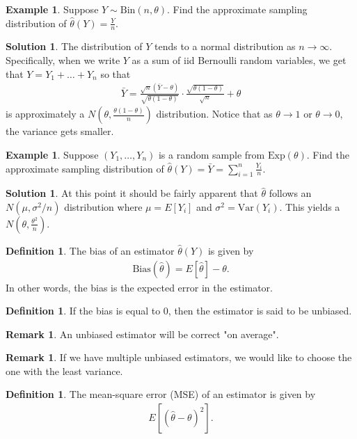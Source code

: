 \documentclass[11pt]{amsart}
\theoremstyle{definition}
\newtheorem{definition}[theorem]{Definition}
\newtheorem{remark}[theorem]{Remark}
\newtheorem{example}[theorem]{Example}
\newtheorem{solution}[theorem]{Solution}
\numberwithin{equation}{section}
\begin{document}
\begin{example}
    Suppose $Y\sim \mathrm{Bin}(n,\theta)$. Find the approximate sampling distribution of $\hat\theta(Y)=\frac{Y}{n}$.
\end{example}
\addtocounter{theorem}{-1}
\begin{solution}
    The distribution of $Y$ tends to a normal distribution as $n\to\infty$. Specifically, when we write $Y$ as a sum of iid Bernoulli random variables, we get that $Y=Y_1+\ldots+Y_n$ so that
    \begin{align*}
        \bar Y=\frac{\sqrt{n}(\bar Y-\theta)}{\sqrt{\theta(1-\theta)}}\cdot\frac{\sqrt{\theta(1-\theta)}}{\sqrt n}+\theta
    \end{align*}
    is approximately a $N(\theta,\frac{\theta(1-\theta)}{n})$ distribution. Notice that as $\theta\to 1$ or $\theta\to 0$, the variance gets smaller.
\end{solution}
\begin{example}
    Suppose $(Y_1,\ldots,Y_n)$ is a random sample from $\mathrm{Exp}(\theta)$. Find the approximate sampling distribution of $\hat\theta(Y)=\bar Y=\sum_{i=1}^n\frac{Y_i}{n}$.
\end{example}
\addtocounter{theorem}{-1}
\begin{solution}
    At this point it should be fairly apparent that $\hat\theta$ follows an $N(\mu,\sigma^2/n)$ distribution where $\mu=E[Y_i]$ and $\sigma^2=\mathrm{Var}(Y_i)$. This yields a $N(\theta,\frac{\theta^2}{n})$.
\end{solution}
\begin{definition}
    The bias of an estimator $\hat\theta(Y)$ is given by 
    \begin{align*}
        \mathrm{Bias}(\hat\theta)=E[\hat\theta]-\theta.
    \end{align*}
    In other words, the bias is the expected error in the estimator.
\end{definition}
\begin{definition}
    If the bias is equal to 0, then the estimator is said to be unbiased.
\end{definition}
\begin{remark}
    An unbiased estimator will be correct "on average".
\end{remark}
\begin{remark}
    If we have multiple unbiased estimators, we would like to choose the one with the least variance.
\end{remark}
\begin{definition}
    The mean-square error (MSE) of an estimator is given by 
    \begin{align*}
        E[(\hat\theta-\theta)^2].
    \end{align*}
\end{definition}
\end{document}
